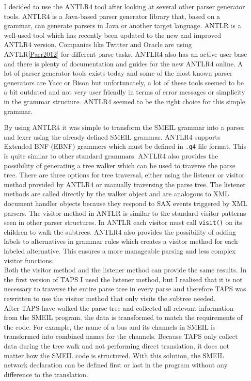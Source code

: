I decided to use the ANTLR4 tool after looking at several other parser generator tools. ANTLR4 is a Java-based parser generator library that, based on a grammar, can generate parsers in Java or another target language. ANTLR is a well-used tool which has recently been updated to the new and improved ANTLR4 version. Companies like Twitter and Oracle are using ANTLR\ref{Parr2012} for different parse tasks. ANTLR4 also has an active user base and there is plenty of documentation and guides for the new ANTLR4 online. A lot of parser generator tools exists today and some of the most known parser generators are Yacc or Bison but unfortunately, a lot of these tools seemed to be a bit outdated and not very user friendly in terms of error messages or simplicity in the grammar structure. ANTLR4 seemed to be the right choice for this simple grammar.

By using ANTLR4 it was simple to transform the SMEIL grammar into a parser and lexer using the already defined SMEIL grammar. ANTLR4 supports Extended BNF (EBNF) grammers which must be defined in \texttt{.g4} file format. This is quite similar to other standard grammars. ANTLR4 also provides the possibility of generating a tree walker which can be used to traverse the parse tree. There are three options for tree traversal, either using the listener or visitor method provided by ANTLR4 or manually traversing the parse tree.
The listener methods are called directly by the walker object and are analogous to XML document handler objects because they respond to SAX events triggered by XML parsers. The visitor method in ANTLR is similar to the standard visitor patterns seen in other parser structures. In ANTLR each visitor must call \texttt{visit()} on its children to walk the subtrees. ANTLR4 also provides the possibility of adding labels to alternatives in grammar rules which creates a visitor method for each labeled alternative. This ensures a more manageable parsing and less complex visitor functions. \\

Both the visitor method and the listener method can provide the same results. In the first version of TAPS I used the listener method, but I realised that it is not necessary to traverse the entire parse tree in every parse and therefore TAPS was rewritten to use the visitor method that only visits the subtree needed.\\

After TAPS have walked the parse tree and collected all relevant information from the SMEIL program, the data is transformed to match the requirements of the \cspm{} code. For example, the name of a bus and its channels in SMEIL is transformed into combined names for the \cspm{} channels. Because TAPS only collect data during the tree walk and not performing direct translation, it does not matter how the SMEIL code is structured. With this solution, the SMEIL network declaration can be defined first or last in the program without any difference to the translation.\\

